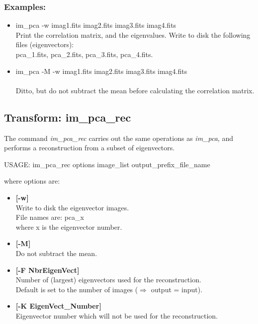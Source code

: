 \subsubsection{Examples:}
\begin{itemize}
\item  im\_pca -w imag1.fits imag2.fits imag3.fits imag4.fits\\
Print the correlation matrix, and the eigenvalues. Write to 
disk the following files (eigenvectors): \\
pca\_1.fits, pca\_2.fits, pca\_3.fits, pca\_4.fits.
\item  im\_pca -M -w imag1.fits imag2.fits imag3.fits imag4.fits\\ \\
Ditto, but do not subtract the mean before calculating the correlation matrix.
\end{itemize}


\subsection{Transform: im\_pca\_rec}
The command
{\em im\_pca\_rec} carries out the same operations as {\em im\_pca}, and
performs a reconstruction from a subset of eigenvectors. 
{\bf
\begin{center}
USAGE: im\_pca\_rec options image\_list output\_prefix\_file\_name
\end{center}}
where options are:
\begin{itemize}
\item {\bf[-w]}  \\
Write to disk the eigenvector images. \\
File names are: pca\_x \\
where x is the eigenvector number.
\item{\bf [-M]} \\
 Do not subtract the mean.
\item{\bf [-F NbrEigenVect]} \\
Number of (largest) eigenvectors used for the reconstruction. \\
Default is set to the number of images ($\Longrightarrow$ output = input).
\item{\bf [-K EigenVect\_Number]} \\
Eigenvector number which will not be used for the reconstruction.
\end{itemize}
